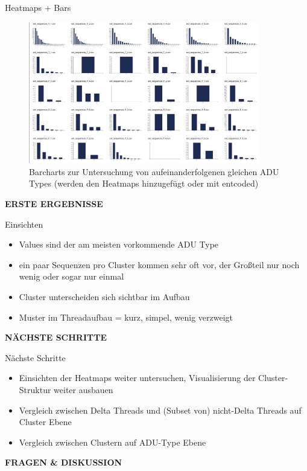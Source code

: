 \documentclass[compress,12pt]{beamer}
\begin{document}
    \begin{frame}{Heatmaps + Bars}
        \begin{figure}
            \centering
            \includegraphics[width=0.9\textwidth]{../images/heatmap-bars-example}
            \caption{Barcharts zur Untersuchung von aufeinanderfolgenen gleichen ADU Types (werden den Heatmaps hinzugefügt oder mit entcoded)}
            \label{fig:heatmap-bars-example}
        \end{figure}
    \end{frame}

    \begin{frame}
        \centering
        \textbf{ERSTE ERGEBNISSE}
    \end{frame}

    \begin{frame}{Einsichten}
        \begin{itemize}
            \item Values sind der am meisten vorkommende ADU Type
            \item ein paar Sequenzen pro Cluster kommen sehr oft vor, der Großteil nur noch wenig oder sogar nur einmal
            \item Cluster unterscheiden sich sichtbar im Aufbau
            \item Muster im Threadaufbau = kurz, simpel, wenig verzweigt
        \end{itemize}
    \end{frame}

    \begin{frame}
        \centering
        \textbf{NÄCHSTE SCHRITTE}
    \end{frame}

    \begin{frame}{Nächste Schritte}
        \begin{itemize}
            \item Einsichten der Heatmaps weiter untersuchen, Visualisierung der Cluster-Struktur weiter ausbauen
            \item Vergleich zwischen Delta Threads und (Subset von) nicht-Delta Threads auf Cluster Ebene
            \item Vergleich zwischen Clustern auf ADU-Type Ebene
        \end{itemize}
    \end{frame}

    \End

    \begin{frame}
        \centering
        \textbf{FRAGEN \& DISKUSSION}
    \end{frame}
\end{document}
